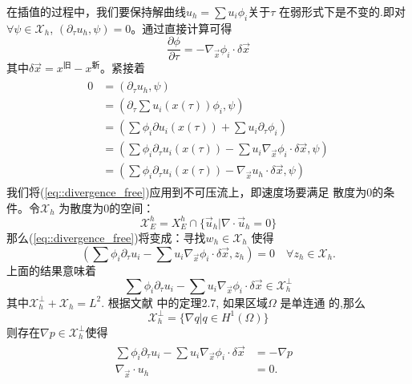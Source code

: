 \documentclass{report}
\theoremstyle{Remark}
\begin{document}
    在插值的过程中，我们要保持解曲线$u_h = \sum u_i \phi_i$关于$\tau$
    在弱形式下是不变的.即对$\forall \psi \in \mathcal{X}_h$,
    $(\partial_{\tau} u_h, \psi) = 0$。通过直接计算可得 
    \begin{equation}
      \frac{\partial \phi}{\partial \tau} = -\nabla_{\vec{x}} \phi_i
      \cdot \delta \vec{x}
    \end{equation}
    其中$\delta \vec{x} = x^{\text{旧}} - x^{\text{新}}$。紧接着
    \begin{eqnarray}
      \begin{aligned}
        0 & = (\partial_{\tau} u_h , \psi) \\
        & = (\partial_{\tau} \sum u_i(x(\tau)) \phi_i, \psi) \\ 
        & = (\sum \phi_i \partial u_i(x(\tau)) + \sum u_i \partial_{\tau}
        \phi_i) \\ 
        & =  (\sum \phi_i \partial_{\tau} u_i(x(\tau)) -\sum u_i
        \nabla_{\vec{x}}\phi_i \cdot \delta \vec{x}, \psi) \\
        & =  (\sum \phi_i \partial_{\tau} u_i(x(\tau)) - \nabla_{\vec{x}}u_h
        \cdot \delta \vec{x}, \psi)
     \end{aligned}
     \label{eq::divergence_free}
    \end{eqnarray}
    我们将(\ref{eq::divergence_free})应用到不可压流上，即速度场要满足
    散度为0的条件。令$\mathcal{X}_h$ 为散度为0的空间：
    \begin{equation}
      \mathcal{X}_E^h = X_E^h \cap \{\vec{u}_h|\nabla \cdot \vec{u}_h
      = 0 \}
    \end{equation}
    那么(\ref{eq::divergence_free})将变成：寻找$w_h \in
    \mathcal{X}_h$ 使得
    \begin{equation}
      \left( \sum \phi_i \partial_{\tau} u_i - \sum u_i \nabla_{\vec{x}}
      \phi_i \cdot \delta \vec{x}, z_h \right) = 0 \quad \forall z_h
      \in \mathcal{X}_h.
      \label{eq::div_free_space}
    \end{equation}
    上面的结果意味着
    \begin{equation}
      \sum \phi_i \partial_{\tau} u_i - \sum u_i \nabla_{\vec{x}}
      \phi_i \cdot \delta \vec{x} \in \mathcal{X}_h^{\perp}
    \end{equation}
    其中$\mathcal{X}_h^{\perp} + \mathcal{X}_h = L^2$. 根据文献
    \cite{gunzburger2012finite}中的定理2.7, 如果区域$\Omega$ 是单连通
    的,那么
    \begin{equation}
      \mathcal{X}_h^{\perp} = \{ \nabla q | q \in H^1(\Omega) \}
      \label{eq::orthogonal_space}
    \end{equation}
    则存在$\nabla p \in \mathcal{X}_h^{\perp}$使得
    \begin{eqnarray}
      \begin{aligned}
        \sum \phi_i \partial_{\tau} u_i - \sum u_i \nabla_{\vec{x}}
        \phi_i \cdot \delta \vec{x}  &=  -\nabla p &\\
        \nabla_{\vec{x}} \cdot u_h   &=  0.&
      \end{aligned}
      \label{eq::continous_update}
    \end{eqnarray}
\end{document}
